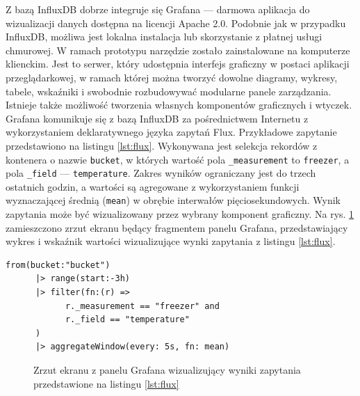 \documentclass[a4paper, 12pt, twoside]{article}
\begin{document}
Z bazą InfluxDB dobrze integruje się Grafana --- darmowa aplikacja do wizualizacji
danych dostępna na licencji Apache 2.0. Podobnie jak
w przypadku InfluxDB, możliwa jest lokalna instalacja lub skorzystanie z
płatnej usługi chmurowej. W ramach prototypu narzędzie zostało zainstalowane
na komputerze klienckim. Jest to serwer, który udostępnia interfejs graficzny
w postaci aplikacji przeglądarkowej, w ramach której można tworzyć
dowolne diagramy, wykresy, tabele, wskaźniki i swobodnie rozbudowywać
modularne panele zarządzania. Istnieje także możliwość tworzenia własnych komponentów
graficznych i wtyczek.
Grafana komunikuje się z bazą InfluxDB za pośrednictwem Internetu z wykorzystaniem
deklaratywnego języka zapytań Flux. Przykładowe zapytanie przedstawiono na
listingu \ref{lst:flux}. Wykonywana jest selekcja
rekordów z kontenera o nazwie \texttt{bucket}, w których wartość pola
\texttt{\_measurement} to \texttt{freezer}, a pola \texttt{\_field} --- \texttt{temperature}.
Zakres wyników ograniczany jest do trzech ostatnich godzin, a wartości
są agregowane z wykorzystaniem funkcji wyznaczającej średnią (\texttt{mean}) w obrębie interwałów
pięciosekundowych. Wynik zapytania może być wizualizowany przez wybrany komponent
graficzny. Na rys. \ref{fig:grafana-1} zamieszczono zrzut ekranu będący fragmentem panelu Grafana,
przedstawiający wykres i wskaźnik wartości wizualizujące wynki zapytania z listingu \ref{lst:flux}.


\begin{lstlisting}[caption={Przykładowe zapytanie w języku Flux}, label={lst:flux}]
from(bucket:"bucket")
      |> range(start:-3h)
      |> filter(fn:(r) =>
            r._measurement == "freezer" and
            r._field == "temperature"
      )
      |> aggregateWindow(every: 5s, fn: mean)
\end{lstlisting}

\begin{figure}[h]
      \centering
      \caption{Zrzut ekranu z panelu Grafana wizualizujący wyniki zapytania przedstawione na listingu \ref{lst:flux}}
      \label{fig:grafana-1}
\end{figure}
\end{document}
